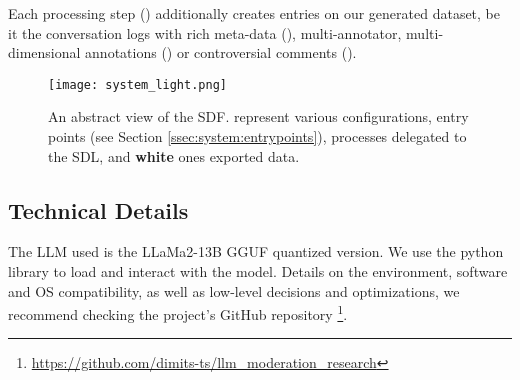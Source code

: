 Each processing step () additionally creates entries on our generated dataset, be it the conversation logs with rich meta-data (), multi-annotator, multi-dimensional annotations () or controversial comments ().

\begin{figure}
	\centering
	\texttt{[image: system\_light.png]}
	\caption{An abstract view of the SDF.  represent various configurations,  entry points (see Section \ref{ssec:system:entrypoints}),  processes delegated to the SDL, and \textbf{white} ones exported data.}
	\label{fig::system}
\end{figure}



\subsection{Technical Details}
\label{ssec:system:details}

The LLM used is the LLaMa2-13B GGUF quantized version. We use the  python library to load and interact with the model. Details on the environment, software and OS compatibility, as well as low-level decisions and optimizations, we recommend checking the project's GitHub repository \footnote{\url{https://github.com/dimits-ts/llm_moderation_research}}.


